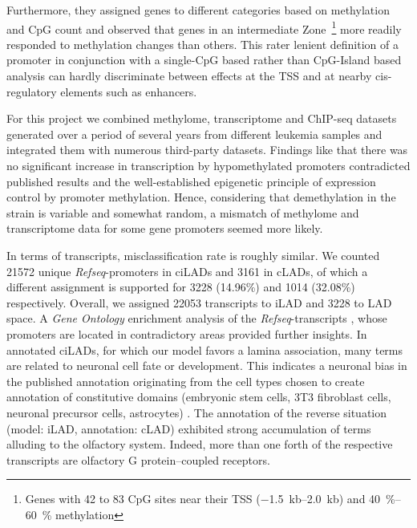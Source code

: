 
Furthermore, they assigned genes to different categories based on methylation and CpG count and observed that genes in an intermediate Zone~\footnote{Genes with 42 to 83 CpG sites near their TSS (\SIrange{-1.5}{2.0}{\kilo b}) and \SIrange{40}{60}{\percent} methylation} more readily responded to methylation changes than others\cite{He2019}. This rater lenient definition of a promoter in conjunction with a single-CpG based rather than CpG-Island based analysis can hardly discriminate between effects at the TSS and at nearby cis-regulatory elements such as enhancers. 

For this project we combined methylome, transcriptome and ChIP-seq datasets generated over a period of several years from different leukemia samples and integrated them with numerous third-party datasets. Findings like that there was no significant increase in transcription by hypomethylated promoters contradicted published results\cite{Trowbridge2012} and the well-established epigenetic principle of expression control by promoter methylation\cite{Vire2006}. Hence, considering that demethylation in the \dnmtchip strain is variable and somewhat random, a mismatch of methylome and transcriptome data for some gene promoters seemed more likely. 


In terms of transcripts, misclassification rate is roughly similar. We counted 21572 unique \emph{Refseq}-promoters in ciLADs and 3161 in cLADs, of which a different assignment is supported for 3228 (14.96\%) and 1014 (32.08\%) respectively. Overall, we assigned 22053 transcripts to iLAD and 3228 to LAD space. A \emph{Gene Ontology} enrichment analysis of the \emph{Refseq}-transcripts , whose promoters are located in contradictory areas provided further insights. In annotated ciLADs, for which our model favors a lamina association, many terms are related to neuronal cell fate or development. This indicates a neuronal bias in the published annotation originating from the cell types chosen to create annotation of constitutive domains (embryonic stem cells, 3T3 fibroblast cells, neuronal precursor cells, astrocytes) \cite{Meuleman2013}. The annotation of the reverse situation (model: iLAD, annotation: cLAD) exhibited strong	accumulation of terms alluding to the olfactory system. Indeed, more than one forth of the respective transcripts are olfactory G protein–coupled receptors. 

